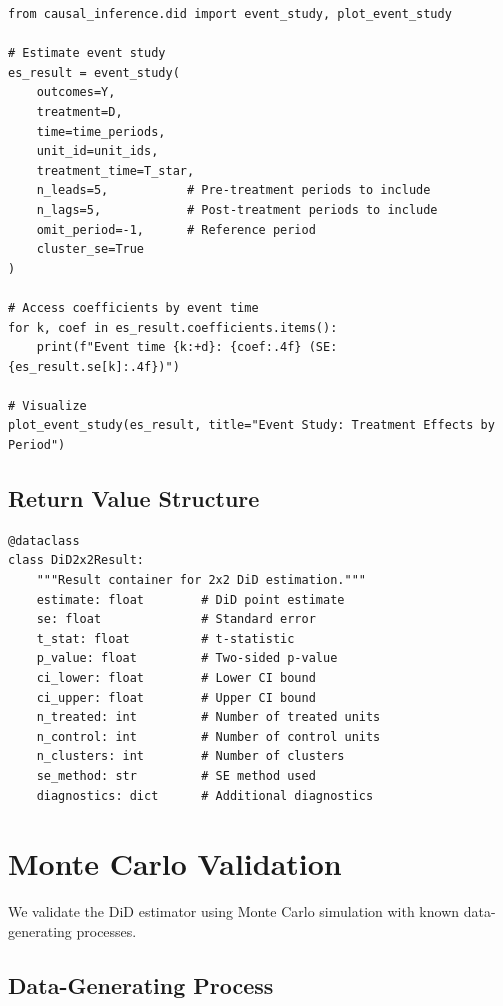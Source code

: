 \begin{verbatim}
from causal_inference.did import event_study, plot_event_study

# Estimate event study
es_result = event_study(
    outcomes=Y,
    treatment=D,
    time=time_periods,
    unit_id=unit_ids,
    treatment_time=T_star,
    n_leads=5,           # Pre-treatment periods to include
    n_lags=5,            # Post-treatment periods to include
    omit_period=-1,      # Reference period
    cluster_se=True
)

# Access coefficients by event time
for k, coef in es_result.coefficients.items():
    print(f"Event time {k:+d}: {coef:.4f} (SE: {es_result.se[k]:.4f})")

# Visualize
plot_event_study(es_result, title="Event Study: Treatment Effects by Period")
\end{verbatim}

\subsection{Return Value Structure}

\begin{verbatim}
@dataclass
class DiD2x2Result:
    """Result container for 2x2 DiD estimation."""
    estimate: float        # DiD point estimate
    se: float              # Standard error
    t_stat: float          # t-statistic
    p_value: float         # Two-sided p-value
    ci_lower: float        # Lower CI bound
    ci_upper: float        # Upper CI bound
    n_treated: int         # Number of treated units
    n_control: int         # Number of control units
    n_clusters: int        # Number of clusters
    se_method: str         # SE method used
    diagnostics: dict      # Additional diagnostics
\end{verbatim}

\section{Monte Carlo Validation}
\label{sec:did_validation}

We validate the DiD estimator using Monte Carlo simulation with known data-generating processes.

\subsection{Data-Generating Process}

